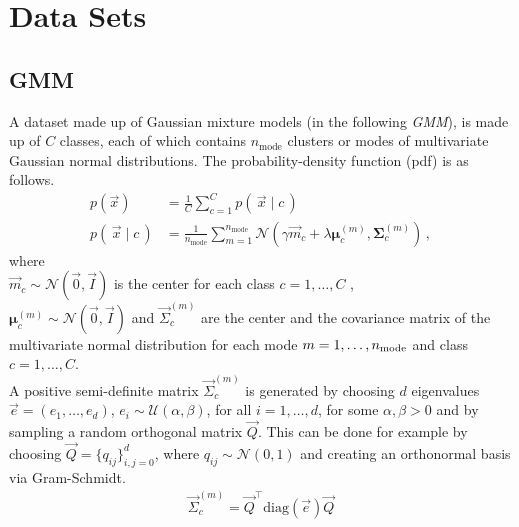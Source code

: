 \section{Data Sets}
\label{sec:datasets}

\subsection{GMM}
\label{sec:datasetgmm}
A dataset made up of Gaussian mixture models (in the following \textit{GMM}), 
is made up of $C$ classes, each of which contains $n_\text{mode}$ clusters or modes of multivariate Gaussian normal distributions. The probability-density function (pdf) is as follows.
\begin{align}
\label{eqn:gmm_distr}
    p(\vec x) &= \frac 1 C \sum_{c=1}^C p(\, \vec x \mid c \,) \nonumber\\
    p(\, \vec x \mid c \,) &= \frac 1 {n_\text{mode}} \sum _{m=1}^{n_\text{mode}}
    \mathcal N (\gamma \vec m_c + \lambda \boldsymbol \mu_c^{(m)}, \boldsymbol \Sigma_c^{(m)}) \, ,
\end{align}
where \\
$\vec m_c \sim \mathcal N (\vec 0, \vec I)$ is the center for each class $c=1,\ldots, C$ ,\\
$\boldsymbol \mu_c^{(m)} \sim \mathcal N (\vec 0, \vec I)$ and
$\vec \Sigma_c^{(m)}$ are the center and the covariance matrix of the multivariate normal distribution
for each mode $m=1,\ldots, n_{\textnormal{mode}}$ and class $c=1,\ldots, C$.  \\
A positive semi-definite matrix $\vec \Sigma_c^{(m)}$ is generated by choosing $d$ eigenvalues $\vec e = (e_1, \ldots, e_d)$, $e_i \sim \mathcal U(\alpha, \beta)$, for all $i=1, \ldots, d$, for some $\alpha, \beta > 0$ and 
by sampling a random orthogonal matrix $\vec Q$. 
This can be done for example by choosing $\vec Q = \{q_{ij}\}_{i,j=0}^{d}$, 
where $q_{ij} \sim \mathcal N(0, 1)$
and creating an orthonormal basis via Gram-Schmidt. 
\begin{align*}
    \vec \Sigma_c^{(m)} = \vec Q^\top \text{diag}(\vec e) \vec Q
\end{align*}

